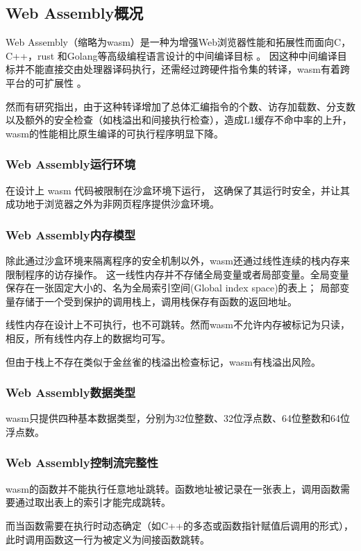 \subsection{Web Assembly概况}
Web Assembly（缩略为wasm）是一种为增强Web浏览器性能和拓展性而面向C，C++，rust 和Golang等高级编程语言设计的中间编译目标\nolinebreak
\cite{wasmCommunityGroup, lehmannWasabiFrameworkDynamically2019, lehmannEverythingOldNew, bhansaliFirstLookCode2022, waseemIssuesTheirCauses2024}。\nolinebreak
因这种中间编译目标并不能直接交由处理器译码执行，还需经过跨硬件指令集的转译，wasm有着跨平台的可扩展性\nolinebreak
\cite{lehmannEverythingOldNew, waseemIssuesTheirCauses2024, lehmannWasabiFrameworkDynamically2019, JayProvablySafe}。\nolinebreak

然而有研究\cite{JangdaNotsoFast}指出，由于这种转译增加了总体汇编指令的个数、访存加载数、分支数以及额外的安全检查（如栈溢出和间接执行检查），造成L1缓存不命中率的上升，wasm的性能相比原生编译的可执行程序明显下降。

\subsubsection{Web Assembly运行环境}
在设计上 wasm 代码被限制在沙盒环境下运行\cite{johnsonWaVeVerifiablySecure2023,WasmbpfStreamliningEBPF2024}，\nolinebreak
这确保了其运行时安全，并让其成功地于浏览器之外为非网页程序提供沙盒环境\cite{narayanSwivelHardeningWebAssembly, WebAssemblySummaryOnSecurity, 9156135}。

\subsubsection{Web Assembly内存模型}
除此通过沙盒环境来隔离程序的安全机制以外，wasm还通过线性连续的栈内存来限制程序的访存操作。\nolinebreak
这一线性内存并不存储全局变量或者局部变量。全局变量保存在一张固定大小的、名为全局索引空间(Global index space)的表上；\nolinebreak
局部变量存储于一个受到保护的调用栈上，调用栈保存有函数的返回地址。

线性内存在设计上不可执行，也不可跳转。然而wasm不允许内存被标记为只读，相反，所有线性内存上的数据均可写\cite{lehmannEverythingOldNew}。

但由于栈上不存在类似于金丝雀的栈溢出检查标记，wasm有栈溢出风险。
\subsubsection{Web Assembly数据类型}
wasm只提供四种基本数据类型\cite{wasmCommunityGroup,lehmannEverythingOldNew}，分别为32位整数、32位浮点数、64位整数和64位浮点数。
\subsubsection{Web Assembly控制流完整性}
wasm的函数并不能执行任意地址跳转。函数地址被记录在一张表上，调用函数需要通过取出表上的索引才能完成跳转。

而当函数需要在执行时动态确定（如C++的多态或函数指针赋值后调用的形式），此时调用函数这一行为被定义为间接函数跳转\cite{Daniel2019DiscoveringVI}。